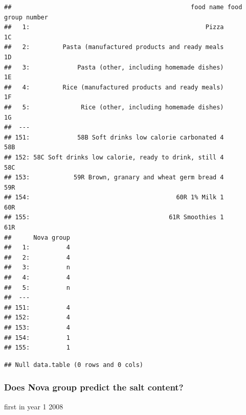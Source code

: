 \documentclass[
]{article}
\begin{document}
\begin{verbatim}
##                                                 food name food group number
##   1:                                                Pizza                1C
##   2:         Pasta (manufactured products and ready meals                1D
##   3:             Pasta (other, including homemade dishes)                1E
##   4:         Rice (manufactured products and ready meals)                1F
##   5:              Rice (other, including homemade dishes)                1G
##  ---                                                                       
## 151:             58B Soft drinks low calorie carbonated 4               58B
## 152: 58C Soft drinks low calorie, ready to drink, still 4               58C
## 153:            59R Brown, granary and wheat germ bread 4               59R
## 154:                                        60R 1% Milk 1               60R
## 155:                                      61R Smoothies 1               61R
##      Nova group
##   1:          4
##   2:          4
##   3:          n
##   4:          4
##   5:          n
##  ---           
## 151:          4
## 152:          4
## 153:          4
## 154:          1
## 155:          1
\end{verbatim}

\begin{verbatim}
## Null data.table (0 rows and 0 cols)
\end{verbatim}

\hypertarget{does-nova-group-predict-the-salt-content}{%
\subsubsection{Does Nova group predict the salt
content?}\label{does-nova-group-predict-the-salt-content}}

first in year 1 2008
\end{document}
